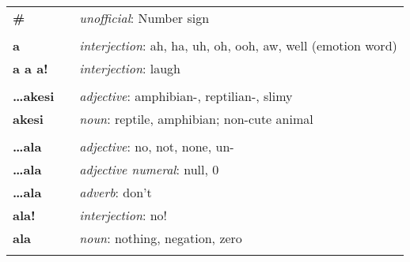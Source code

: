 \begin{supertabular}{p{2,5cm}|ll}
    \textbf{\#}                  &  & \textit{unofficial}: Number sign                                                                           \\
                                 &  &                                                                                                            \\
    \textbf{a}                   &  & \textit{interjection}: ah, ha, uh, oh, ooh, aw, well (emotion word)                                        \\
    \textbf{a a a!}              &  & \textit{interjection}: laugh                                                                               \\
                                 &  &                                                                                                            \\
    \textbf{\dots akesi}         &  & \textit{adjective}: amphibian-, reptilian-, slimy                                                          \\
    \textbf{akesi}               &  & \textit{noun}: reptile, amphibian; non-cute animal                                                         \\
                                 &  &                                                                                                            \\
    \textbf{\dots ala}           &  & \textit{adjective}: no, not, none, un-                                                                     \\
    \textbf{\dots ala}           &  & \textit{adjective numeral}: null, 0                                                                        \\
    \textbf{\dots ala}           &  & \textit{adverb}: don't                                                                                     \\
    \textbf{ala!}                &  & \textit{interjection}: no!                                                                                 \\
    \textbf{ala}                 &  & \textit{noun}: nothing, negation, zero                                                                     \\
                                 &  &                                                                                                            \\

\end{supertabular}
